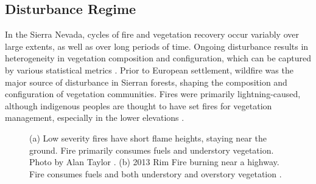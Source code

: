 
\subsection{Disturbance Regime}
\label{distregime}
In the Sierra Nevada, cycles of fire and vegetation recovery occur variably over large extents, as well as over long periods of time. Ongoing disturbance results in heterogeneity in vegetation composition and configuration, which can be captured by various statistical metrics \citep{Monica2008}. Prior to European settlement, wildfire was the major source of disturbance in Sierran forests, shaping the composition and configuration of vegetation communities. Fires were primarily lightning-caused, although indigenous peoples are thought to have set fires for vegetation management, especially in the lower elevations \citep{Anderson1996}. 

\begin{figure}[!htbp]
  \centering
   \caption{(a) Low severity fires have short flame heights, staying near the ground. Fire primarily consumes fuels and understory vegetation. Photo by Alan Taylor \citep{lowseverityfirephoto}. (b) 2013 Rim Fire burning near a highway. Fire consumes fuels and both understory and overstory vegetation \citep{highseverityphoto}.} 
\label{figs:fireseverity}
\end{figure}

